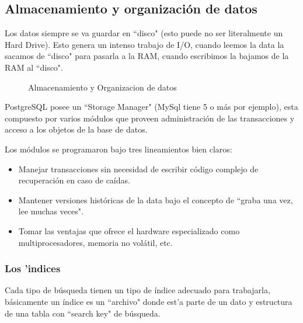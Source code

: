 \subsection{Almacenamiento y organizaci\'on de datos}
Los datos siempre se va guardar en ``disco" (esto puede no ser literalmente un Hard Drive).
Esto genera un intenso trabajo de I/O, cuando leemos la data la sacamos de ``disco" para pasarla a la RAM, cuando escribimos la bajamos de la RAM al ``disco".
\begin{figure}[H]
\centering
{}
\caption{Almacenamiento y Organizacion de datos} \label{fig:almacenamientoorganizaciondatos}
\end{figure}
PostgreSQL posee un ``Storage Manager" (MySql tiene 5 o m\'as por ejemplo), esta compuesto por varios m\'odulos que proveen administraci\'on de las transacciones y acceso a los objetos de la base de datos.

Los m\'odulos se programaron bajo tres lineamientos bien claros:
\begin{itemize}
\item Manejar transacciones sin necesidad de escribir c\'odigo complejo de recuperaci\'on en caso de ca\'idas.
\item Mantener versiones hist\'oricas  de la data bajo el concepto de ``graba una vez, lee muchas veces".
\item Tomar las ventajas que ofrece el hardware especializado como multiprocesadores, memoria no vol\'atil, etc.  
\end{itemize}
\subsubsection{Los 'indices}
Cada tipo de b\'usqueda tienen un tipo de \'indice adecuado para trabajarla, b\'asicamente un \'indice es un ``archivo" donde est'a parte de un dato y estructura de una tabla con ``search key" de b\'usqueda.\\
